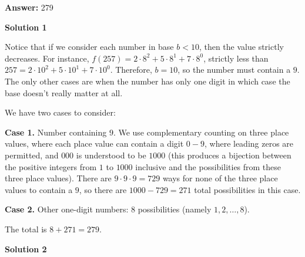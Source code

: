 \begin{enumerate}
 
 \textbf{Answer: }279



\textbf{Solution 1}

Notice that if we consider each number in base $b<10$, then the value strictly decreases. For instance, $f(257)=2\cdot 8^2+5\cdot 8^1+7\cdot 8^0$, strictly less than $257=2\cdot 10^2+5\cdot 10^1+7\cdot 10^0$. Therefore, $b=10$, so the number must contain a $9$. The only other cases are when the number has only one digit in which case the base doesn't really matter at all.

 We have two cases to consider:

 \textbf{Case 1.} Number containing $9$. We use complementary counting on three place values, where each place value can contain a digit $0-9$, where leading zeros are permitted, and $000$ is understood to be $1000$ (this produces a bijection between the positive integers from $1$ to $1000$ inclusive and the possibilities from these three place values). There are $9\cdot9\cdot9=729$ ways for none of the three place values to contain a $9$, so there are $1000-729=271$ total possibilities in this case.

 \textbf{Case 2.} Other one-digit numbers: $8$ possibilities (namely $1,2,\ldots,8$).

 The total is $8+271=\boxed{279}$.

 



\textbf{Solution 2}


\end{enumerate}
